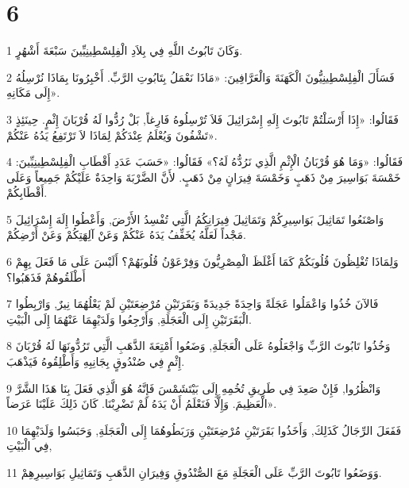 \chapter{6}

\par 1 وَكَانَ تَابُوتُ اللَّهِ فِي بِلاَدِ الْفِلِسْطِينِيِّينَ سَبْعَةَ أَشْهُرٍ.
\par 2 فَسَأَلَ الْفِلِسْطِينِيُّونَ الْكَهَنَةَ وَالْعَرَّافِينَ: «مَاذَا نَعْمَلُ بِتَابُوتِ الرَّبِّ. أَخْبِرُونَا بِمَاذَا نُرْسِلُهُ إِلَى مَكَانِهِ».
\par 3 فَقَالُوا: «إِذَا أَرْسَلْتُمْ تَابُوتَ إِلَهِ إِسْرَائِيلَ فَلاَ تُرْسِلُوهُ فَارِغاً, بَلْ رُدُّوا لَهُ قُرْبَانَ إِثْمٍ. حِينَئِذٍ تَشْفُونَ وَيُعْلَمُ عِنْدَكُمْ لِمَاذَا لاَ تَرْتَفِعُ يَدُهُ عَنْكُمْ».
\par 4 فَقَالُوا: «وَمَا هُوَ قُرْبَانُ الْإِثْمِ الَّذِي نَرُدُّهُ لَهُ؟» فَقَالُوا: «حَسَبَ عَدَدِ أَقْطَابِ الْفِلِسْطِينِيِّينَ: خَمْسَةَ بَوَاسِيرَ مِنْ ذَهَبٍ وَخَمْسَةَ فِيرَانٍ مِنْ ذَهَبٍ. لأَنَّ الضَّرْبَةَ وَاحِدَةٌ عَلَيْكُمْ جَمِيعاً وَعَلَى أَقْطَابِكُمْ.
\par 5 وَاصْنَعُوا تَمَاثِيلَ بَوَاسِيرِكُمْ وَتَمَاثِيلَ فِيرَانِكُمُ الَّتِي تُفْسِدُ الأَرْضَ, وَأَعْطُوا إِلَهَ إِسْرَائِيلَ مَجْداً لَعَلَّهُ يُخَفِّفُ يَدَهُ عَنْكُمْ وَعَنْ آلِهَتِكُمْ وَعَنْ أَرْضِكُمْ.
\par 6 وَلِمَاذَا تُغْلِظُونَ قُلُوبَكُمْ كَمَا أَغْلَظَ الْمِصْرِيُّونَ وَفِرْعَوْنُ قُلُوبَهُمْ؟ أَلَيْسَ عَلَى مَا فَعَلَ بِهِمْ أَطْلَقُوهُمْ فَذَهَبُوا؟
\par 7 فَالآنَ خُذُوا وَاعْمَلُوا عَجَلَةً وَاحِدَةً جَدِيدَةً وَبَقَرَتَيْنِ مُرْضِعَتَيْنِ لَمْ يَعْلُهُمَا نِيرٌ, وَارْبِطُوا الْبَقَرَتَيْنِ إِلَى الْعَجَلَةِ, وَأَرْجِعُوا وَلَدَيْهِمَا عَنْهُمَا إِلَى الْبَيْتِ.
\par 8 وَخُذُوا تَابُوتَ الرَّبِّ وَاجْعَلُوهُ عَلَى الْعَجَلَةِ, وَضَعُوا أَمْتِعَةَ الذَّهَبِ الَّتِي تَرُدُّونَهَا لَهُ قُرْبَانَ إِثْمٍ فِي صُنْدُوقٍ بِجَانِبِهِ وَأَطْلِقُوهُ فَيَذْهَبَ.
\par 9 وَانْظُرُوا, فَإِنْ صَعِدَ فِي طَرِيقِ تُخُمِهِ إِلَى بَيْتَشَمْسَ فَإِنَّهُ هُوَ الَّذِي فَعَلَ بِنَا هَذَا الشَّرَّ الْعَظِيمَ. وَإِلَّا فَنَعْلَمُ أَنْ يَدَهُ لَمْ تَضْرِبْنَا. كَانَ ذَلِكَ عَلَيْنَا عَرَضاً».
\par 10 فَفَعَلَ الرِّجَالُ كَذَلِكَ, وَأَخَذُوا بَقَرَتَيْنِ مُرْضِعَتَيْنِ وَرَبَطُوهُمَا إِلَى الْعَجَلَةِ, وَحَبَسُوا وَلَدَيْهِمَا فِي الْبَيْتِ,
\par 11 وَوَضَعُوا تَابُوتَ الرَّبِّ عَلَى الْعَجَلَةِ مَعَ الصُّنْدُوقِ وَفِيرَانِ الذَّهَبِ وَتَمَاثِيلِ بَوَاسِيرِهِمْ.
